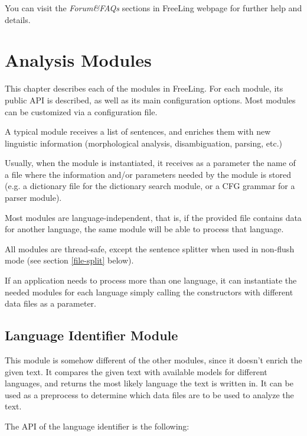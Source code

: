 \documentclass[a4paper]{book}
\begin{document}
You can visit the {\sl Forum\&FAQs} sections in
FreeLing webpage for further help and details.


\chapter{Analysis Modules}
\label{chap-modules}

 This chapter describes each of the modules in FreeLing. For each
 module, its public API is described, as well as its main
 configuration options. Most modules can be customized via a
 configuration file.

 A typical module receives a list of sentences, and enriches them with
 new linguistic information (morphological analysis, disambiguation,
 parsing, etc.)

 Usually, when the module is instantiated, it receives as a parameter
 the name of a file where the information and/or parameters needed by
 the module is stored (e.g. a dictionary file for the dictionary
 search module, or a CFG grammar for a parser module).
 
 Most modules are language-independent, that is, if the provided file
 contains data for another language, the same module will be able to
 process that language.

 All modules are thread-safe, except the sentence splitter when used
 in non-flush mode (see section \ref{file-split} below).

  If an application needs to process more than one language, it can 
 instantiate the needed modules for each language simply calling the 
 constructors with different data files as a parameter.

\section{Language Identifier Module}
\label{lang-ident}

  This module is somehow different of the other modules, since it
  doesn't enrich the given text.  It compares the given text with
  available models for different languages, and returns the most
  likely language the text is written in.
  It can be used as a preprocess to determine which data files are to
  be used to analyze the text.

\noindent  The API of the language identifier is the following:
\end{document}
